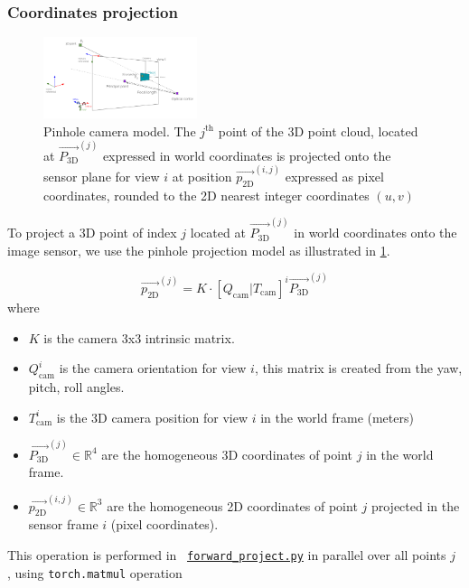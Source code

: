 \subsubsection{Coordinates projection}
\label{sec:coordinates_projection}

\begin{figure}[H]
    \centering
    \includegraphics[width=0.4\textwidth]{figures/pinhole_camera_with_angles.png}
    \caption{Pinhole camera model. The $j^\text{th}$ point of the 3D point cloud, located at $\vec{P_{\textrm{3D}}}^{(j)}$ expressed in world coordinates is projected onto the sensor plane for view $i$ at position $\vec{p_{\textrm{2D}}}^{(i,j)}$ expressed as pixel coordinates, rounded to the 2D nearest integer coordinates $(u,v)$}
    \label{fig:pinhole_camera}
\end{figure}


To project a 3D point of index $j$ located at $\vec{P_{\textrm{3D}}}^{(j)}$ in world coordinates onto the image sensor,
we use the pinhole projection model as illustrated in \ref{fig:pinhole_camera}.

$$\vec{p_{\textrm{2D}}}^{(j)} = K\cdot\left[Q_{\text{cam}} | T_{\text{cam}}\right]^{i}\vec{P_{\textrm{3D}}}^{(j)}$$
where
\begin{itemize}
    \item $K$ is the camera 3x3 intrinsic matrix.
    \item $Q_{\textrm{cam}}^{i}$ is the camera orientation for view $i$, this matrix is created from the yaw, pitch, roll angles.
    \item $T_{\textrm{cam}}^{i}$ is the 3D camera position for view $i$ in the world frame (meters)
    \item $\vec{P_{\textrm{3D}}}^{(j)} \in \mathbb{R}^{4}$ are the homogeneous 3D coordinates of point $j$ in the world frame.
    \item $\vec{p_{\textrm{2D}}}^{(i,j)} \in \mathbb{R}^{3}$ are the homogeneous 2D coordinates of point $j$ projected in the sensor frame $i$ (pixel coordinates).
\end{itemize}

This operation is performed in ~\href{https://github.com/balthazarneveu/per-pixel-point-rendering/blob/main/src/pixr/rendering/forward_project.py}{\texttt{forward\_project.py}} in parallel over all points $j$ , using \texttt{torch.matmul} operation

